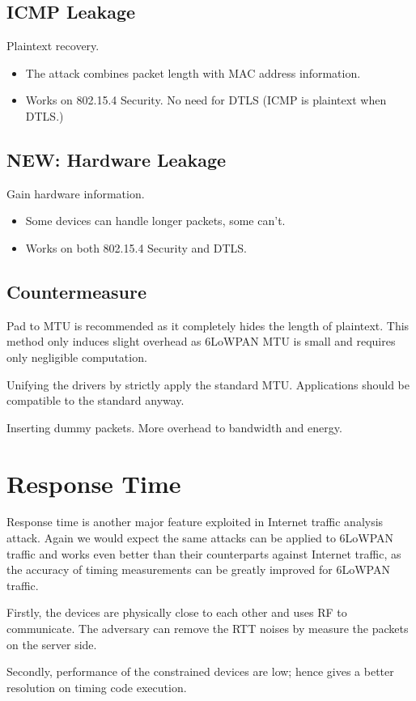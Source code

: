 \documentclass{article}
\begin{document}
\subsection{ICMP Leakage}
Plaintext recovery.
\begin{itemize}
	\item The attack combines packet length with MAC address information.
	\item Works on 802.15.4 Security. No need for DTLS (ICMP is plaintext when DTLS.)
\end{itemize}

\subsection{NEW: Hardware Leakage}
Gain hardware information.
\begin{itemize}
	\item Some devices can handle longer packets, some can't.
	\item Works on both 802.15.4 Security and DTLS.
\end{itemize}

\subsection{Countermeasure}
Pad to MTU is recommended as it completely hides the length of plaintext. This method only induces slight overhead as 6LoWPAN MTU is small and requires only negligible computation.

Unifying the drivers by strictly apply the standard MTU. Applications should be compatible to the standard anyway. 

Inserting dummy packets. More overhead to bandwidth and energy.

\section{Response Time}
Response time is another major feature exploited in Internet traffic analysis attack. Again we would expect the same attacks can be applied to 6LoWPAN traffic and works even better than their counterparts against Internet traffic, as the accuracy of timing measurements can be greatly improved for 6LoWPAN traffic. 

Firstly, the devices are physically close to each other and uses RF to communicate. The adversary can remove the RTT noises by measure the packets on the server side. 

Secondly, performance of the constrained devices are low; hence gives a better resolution on timing code execution.
\end{document}
